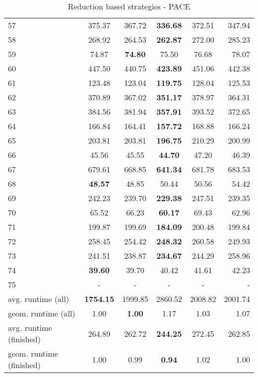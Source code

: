 \documentclass[a4paper,UKenglish,cleveref, autoref, thm-restate]{lipics-v2021}
\begin{document}
\begin{table}
\begin{center}
\begin{tabular}{|l| c| c| c| c| r|}
			57 & 375.37 & 367.72 & \textbf{336.68} & 372.51 & 347.94 \\
			58 & 268.92 & 264.53 & \textbf{262.87} & 272.00 & 285.23 \\
			59 & 74.87 & \textbf{74.80} & 75.50 & 76.68 & 78.07 \\
			60 & 447.50 & 440.75 & \textbf{423.89} & 451.06 & 442.38 \\
			61 & 123.48 & 123.04 & \textbf{119.75} & 128.04 & 125.53 \\
			62 & 370.89 & 367.02 & \textbf{351.17} & 378.97 & 364.31 \\
			63 & 384.56 & 381.94 & \textbf{357.91} & 393.52 & 372.65 \\
			64 & 166.84 & 164.41 & \textbf{157.72} & 168.88 & 166.24 \\
			65 & 203.81 & 203.81 & \textbf{196.75} & 210.29 & 200.99 \\
			66 & 45.56 & 45.55 & \textbf{44.70} & 47.20 & 46.39 \\
			67 & 679.61 & 668.85 & \textbf{641.34} & 681.78 & 683.53 \\
			68 & \textbf{48.57} & 48.85 & 50.44 & 50.56 & 54.42 \\
			69 & 242.23 & 239.70 & \textbf{229.38} & 247.51 & 239.35 \\
			70 & 65.52 & 66.23 & \textbf{60.17} & 69.43 & 62.96 \\
			71 & 199.87 & 199.69 & \textbf{184.09} & 200.48 & 199.84 \\
			72 & 258.45 & 254.42 & \textbf{248.32} & 260.58 & 249.93 \\
			73 & 241.51 & 238.87 & \textbf{234.67} & 244.29 & 258.96 \\
			74 & \textbf{39.60} & 39.70 & 40.42 & 41.61 & 42.23 \\
			75 & - & - & - & - & - \\
			\hline
			avg. runtime (all) & \textbf{1754.15} & 1999.85 & 2860.52 & 2008.82 & 2001.74 \\
			geom. runtime (all) & 1.00 & \textbf{1.00} & 1.17 & 1.03 & 1.07 \\
			avg. runtime (finished) & 264.89 & 262.72 & \textbf{244.25} & 272.45 & 262.85 \\
			geom. runtime (finished) & 1.00 & 0.99 & \textbf{0.94} & 1.02 & 1.00 \\
			\hline
		\end{tabular}
	\end{center}
	\caption{Reduction based strategies - PACE}
\end{table}
\end{document}
